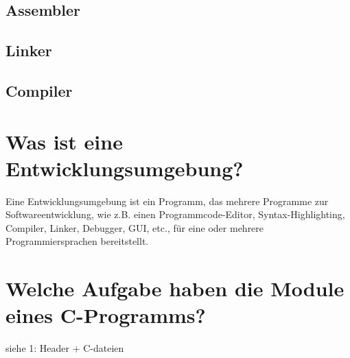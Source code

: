 \documentclass[a4paper, 12pt]{article}
\begin{document}
  \subsection{Assembler}

  \subsection{Linker}

  \subsection{Compiler}
  
  \section{Was ist eine Entwicklungsumgebung?}
  Eine Entwicklungsumgebung ist ein Programm, das mehrere Programme zur
  Softwareentwicklung, wie z.B. einen Programmcode-Editor, Syntax-Highlighting,
  Compiler, Linker, Debugger, GUI, etc., für eine oder mehrere Programmiersprachen bereitstellt.

  \section{Welche Aufgabe haben die Module eines C-Programms?}
  siehe 1: Header + C-dateien


  
\end{document}
